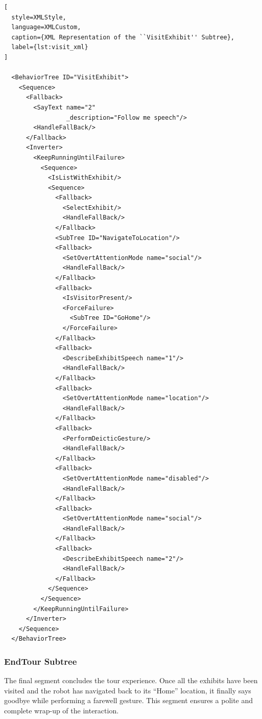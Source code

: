 \documentclass{CSSRforAfrica}
\begin{document}
\begin{lstlisting}[
  style=XMLStyle, 
  language=XMLCustom, 
  caption={XML Representation of the ``VisitExhibit'' Subtree},
  label={lst:visit_xml}
]

  <BehaviorTree ID="VisitExhibit">
    <Sequence>
      <Fallback>
        <SayText name="2"
                 _description="Follow me speech"/>
        <HandleFallBack/>
      </Fallback>
      <Inverter>
        <KeepRunningUntilFailure>
          <Sequence>
            <IsListWithExhibit/>
            <Sequence>
              <Fallback>
                <SelectExhibit/>
                <HandleFallBack/>
              </Fallback>
              <SubTree ID="NavigateToLocation"/>
              <Fallback>
                <SetOvertAttentionMode name="social"/>
                <HandleFallBack/>
              </Fallback>
              <Fallback>
                <IsVisitorPresent/>
                <ForceFailure>
                  <SubTree ID="GoHome"/>
                </ForceFailure>
              </Fallback>
              <Fallback>
                <DescribeExhibitSpeech name="1"/>
                <HandleFallBack/>
              </Fallback>
              <Fallback>
                <SetOvertAttentionMode name="location"/>
                <HandleFallBack/>
              </Fallback>
              <Fallback>
                <PerformDeicticGesture/>
                <HandleFallBack/>
              </Fallback>
              <Fallback>
                <SetOvertAttentionMode name="disabled"/>
                <HandleFallBack/>
              </Fallback>
              <Fallback>
                <SetOvertAttentionMode name="social"/>
                <HandleFallBack/>
              </Fallback>
              <Fallback>
                <DescribeExhibitSpeech name="2"/>
                <HandleFallBack/>
              </Fallback>
            </Sequence>
          </Sequence>
        </KeepRunningUntilFailure>
      </Inverter>
    </Sequence>
  </BehaviorTree>
\end{lstlisting}
 
\subsubsection{EndTour Subtree}
 
The final segment concludes the tour experience. Once all the exhibits have been visited and the robot has navigated back to its ``Home'' location, it finally says goodbye while performing a farewell gesture. This segment ensures a polite and complete wrap-up of the interaction.
\end{document}
